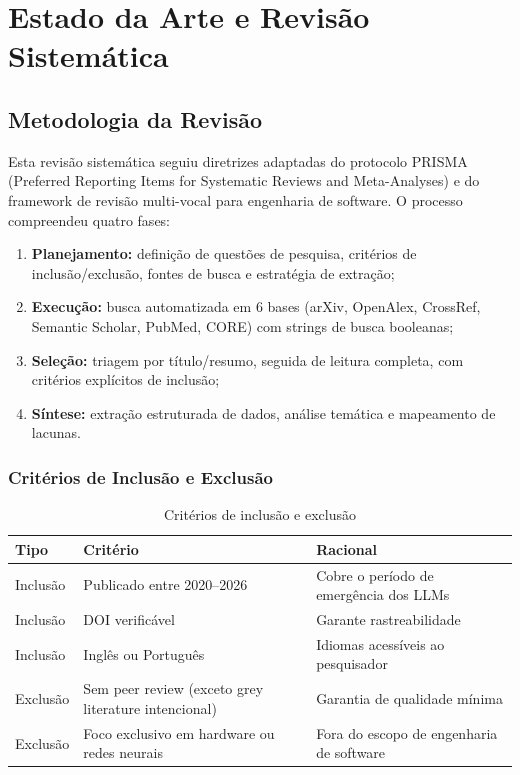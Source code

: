 \documentclass[12pt,a4paper,sumario=tradicional]{abntex2}
\begin{document}
\chapter{Estado da Arte e Revisão Sistemática}

\section{Metodologia da Revisão}

Esta revisão sistemática seguiu diretrizes adaptadas do protocolo PRISMA (Preferred Reporting Items for Systematic Reviews and Meta-Analyses) e do framework de revisão multi-vocal para engenharia de software. O processo compreendeu quatro fases:

\begin{enumerate}[leftmargin=*]
    \item \textbf{Planejamento:} definição de questões de pesquisa, critérios de inclusão/exclusão, fontes de busca e estratégia de extração;
    \item \textbf{Execução:} busca automatizada em 6 bases (arXiv, OpenAlex, CrossRef, Semantic Scholar, PubMed, CORE) com strings de busca booleanas;
    \item \textbf{Seleção:} triagem por título/resumo, seguida de leitura completa, com critérios explícitos de inclusão;
    \item \textbf{Síntese:} extração estruturada de dados, análise temática e mapeamento de lacunas.
\end{enumerate}

\subsection{Critérios de Inclusão e Exclusão}

\begin{table}[H]
\centering
\caption{Critérios de inclusão e exclusão}
\label{tab:criteria}
\begin{tabular}{@{}lp{6cm}p{5cm}@{}}
\toprule
\textbf{Tipo} & \textbf{Critério} & \textbf{Racional} \\
\midrule
Inclusão & Publicado entre 2020--2026 & Cobre o período de emergência dos LLMs \\
Inclusão & DOI verificável & Garante rastreabilidade \\
Inclusão & Inglês ou Português & Idiomas acessíveis ao pesquisador \\
Exclusão & Sem peer review (exceto grey literature intencional) & Garantia de qualidade mínima \\
Exclusão & Foco exclusivo em hardware ou redes neurais & Fora do escopo de engenharia de software \\
\bottomrule
\end{tabular}
\end{table}
\end{document}
